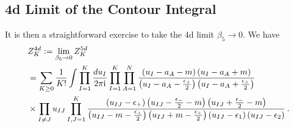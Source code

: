\documentclass[main.tex]{subfiles}
\begin{document}
\subsection{4d Limit of the Contour Integral}
It is then a straightforward exercise to take the 4d limit $\beta_5\to0$. We have
\begin{align}
&Z^{4d}_K:=\lim_{\beta_5\to0}Z^{5d}_K\label{eqn:4dpartitionfunction}\\
&\begin{aligned}
&=\sum_{K\geq0}\frac{1}{K!}\int\prod_{I=1}^K\frac{du_I}{2\pi\mathrm{i}}\prod_{I=1}^K\prod_{A=1}^N\frac{\left(u_{I}-a_A-m\right)\left(u_{I}-a_A+m\right)}{\left(u_{I}-a_A-\frac{\epsilon_+}{2}\right)\left(u_{I}-a_A+\frac{\epsilon_+}{2}\right)}\\
&\times\prod_{I\neq J}u_{IJ}\prod_{I,J=1}^K\frac{\left(u_{IJ}-\epsilon_+\right)\left(u_{IJ}-\frac{\epsilon_-}{2}-m\right)\left(u_{IJ}+\frac{\epsilon_-}{2}-m\right)}{\left(u_{IJ}-m-\frac{\epsilon_+}{2}\right)\left(u_{IJ}+m-\frac{\epsilon_+}{2}\right)\left(u_{IJ}-\epsilon_1\right)\left(u_{IJ}-\epsilon_2\right)}\,.
\end{aligned}
\end{align}
\end{document}
